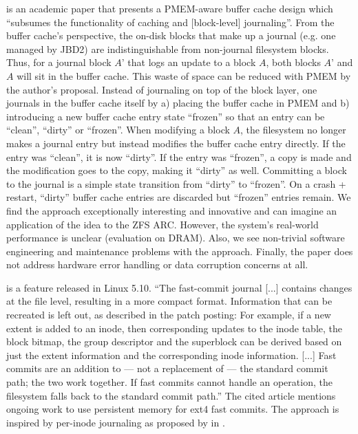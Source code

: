 \documentclass[12pt,a4paper,twoside]{book}
\begin{document}
 is an academic paper that presents a PMEM-aware buffer cache design which
“subsumes the functionality of caching and [block-level] journaling”.
From the buffer cache’s perspective, the on-disk blocks that make up a journal (e.g. one managed by JBD2) are indistinguishable from non-journal filesystem blocks.
Thus, for a journal block $A’$ that logs an update to a block $A$, both blocks $A’$ and $A$ will sit in the buffer cache.
This waste of space can be reduced with PMEM by the author’s proposal.
Instead of journaling on top of the block layer, one journals in the buffer cache itself by a) placing the buffer cache in PMEM and b) introducing a new buffer cache entry state “frozen” so that an entry can be “clean”, “dirty” or “frozen”.
When modifying a block $A$, the filesystem no longer makes a journal entry but instead modifies the buffer cache entry directly.
If the entry was “clean”, it is now “dirty”. If the entry was “frozen”, a copy is made and the modification goes to the copy, making it “dirty” as well.
Committing a block to the journal is a simple state transition from “dirty” to “frozen”. On a crash + restart, “dirty” buffer cache entries are discarded but “frozen” entries remain.
We find the approach exceptionally interesting and innovative and can imagine an application of the idea to the ZFS ARC.
However, the system’s real-world performance is unclear (evaluation on DRAM).
Also, we see non-trivial software engineering and maintenance problems with the approach.
Finally, the paper does not address hardware error handling or data corruption concerns at all.

 is a feature released in Linux 5.10.
“The fast-commit journal [...] contains changes at the file level, resulting in a more compact format.
Information that can be recreated is left out, as described in the patch posting:
For example, if a new extent is added to an inode, then  corresponding updates to the inode table, the block bitmap, the group descriptor and the superblock can be derived based on just the extent information and the corresponding inode information.
    [...] Fast commits are an addition to — not a replacement of — the standard commit path; the two work together.
If fast commits cannot handle an operation, the filesystem falls back to the standard commit path.”
The cited article mentions ongoing work to use persistent memory for ext4 fast commits.
The approach is inspired by per-inode journaling as proposed by \citeauthor{parkIJournalingFinegrainedJournaling2017} in \cite{parkIJournalingFinegrainedJournaling2017}.
\end{document}
